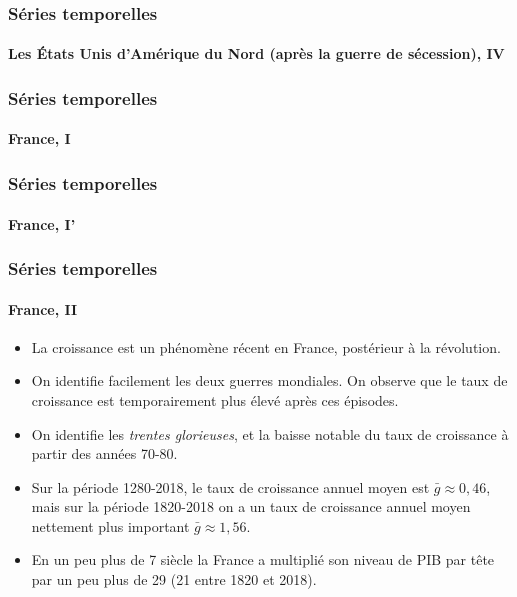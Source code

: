 \documentclass[10pt,notheorems]{beamer}
\theoremstyle{plain}
\theoremstyle{definition} %
\begin{document}
\begin{frame}
  \frametitle{Séries temporelles}
  \framesubtitle{Les États Unis d'Amérique du Nord (après la guerre de sécession), IV}

  \begin{center}
    
  \end{center}

\end{frame}



\begin{frame}
  \frametitle{Séries temporelles}
  \framesubtitle{France, I}

  \begin{center}
    
  \end{center}

\end{frame}

\begin{frame}
  \frametitle{Séries temporelles}
  \framesubtitle{France, I'}

  \begin{center}
    
  \end{center}

\end{frame}


\begin{frame}
  \frametitle{Séries temporelles}
  \framesubtitle{France, II}

  \begin{itemize}

  \item La croissance est un phénomène récent en France, postérieur à la révolution.\newline

  \item On identifie facilement les deux guerres mondiales. On observe que le taux de croissance est temporairement plus élevé après ces épisodes.\newline

  \item On identifie les \textit{trentes glorieuses}, et la baisse notable du taux de croissance à partir des années 70-80.\newline

  \item Sur la période 1280-2018, le taux de croissance annuel moyen est $\bar g \approx 0,46$, mais sur la période 1820-2018 on a un taux de croissance annuel moyen nettement plus important $\bar g \approx 1,56$.\newline

  \item En un peu plus de 7 siècle la France a multiplié son niveau de PIB par tête par un peu plus de 29 (21 entre 1820 et 2018).\newline

  \end{itemize}

\end{frame}
\end{document}
